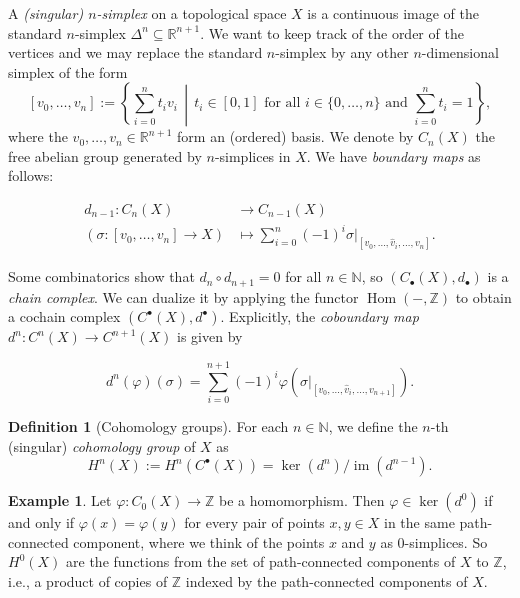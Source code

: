 \documentclass[12pt,a4paper]{amsart}
\theoremstyle{plain}
\theoremstyle{definition}
\newtheorem{defn}[thm]{Definition}
\newtheorem{exmp}[thm]{Example}
\theoremstyle{remark}
\begin{document}
A \emph{(singular) $n$-simplex} on a topological space $X$ is a continuous image of the standard $n$-simplex $\Delta^{n} \subseteq \mathbb{R}^{n+1}$.
We want to keep track of the order of the vertices and we may replace the standard $n$-simplex by any other $n$-dimensional simplex of the form
\[ [v_{0}, \ldots, v_{n}] := \left\{ \sum_{i = 0}^{n} t_{i}v_{i} \,\middle|\, t_{i} \in [0,1] \text{ for all } i \in \{0,\ldots, n\} \text{ and } \sum_{i = 0}^{n} t_{i} = 1 \right\}, \]
where the $v_{0}, \ldots, v_{n} \in \mathbb{R}^{n+1}$ form an (ordered) basis.
We denote by $C_{n}(X)$ the free abelian group generated by $n$-simplices in $X$.
We have \emph{boundary maps} as follows:

\begin{align*}
  d_{n-1} \colon C_{n}(X) & \longrightarrow C_{n-1}(X) \\
  (\sigma \colon [v_{0},\ldots,v_{n}] \to X) & \longmapsto \sum_{i = 0}^{n} (-1)^{i}\sigma|_{[v_{0}, \ldots, \hat{v}_{i}, \ldots, v_{n}]}.
\end{align*}

Some combinatorics \cite[Lemma 2.1]{hat02} show that $d_{n} \circ d_{n+1} = 0$ for all $n \in \mathbb{N}$, so $(C_{\bullet}(X),d_{\bullet})$ is a \emph{chain complex}.
We can dualize it by applying the functor $\operatorname{Hom}(-,\mathbb{Z})$ to obtain a cochain complex $(C^{\bullet}(X),d^{\bullet})$.
Explicitly, the \emph{coboundary map} $d^{n} \colon C^{n}(X) \to C^{n+1}(X)$ is given by

\begin{equation}\label{eqn:coboundary}
  d^{n}(\varphi)(\sigma) = \sum_{i = 0}^{n+1} (-1)^{i}\varphi(\sigma|_{[v_{0}, \ldots, \hat{v}_{i}, \ldots, v_{n+1}]}).
\end{equation}

\begin{defn}[Cohomology groups]
  For each $n \in \mathbb{N}$, we define the $n$-th (singular) \emph{cohomology group} of $X$ as
  \[ H^{n}(X) := H^{n}(C^{\bullet}(X)) = \ker(d^{n})/\operatorname{im}(d^{n-1}). \]
\end{defn}

\begin{exmp}
  Let $\varphi \colon C_{0}(X) \to \mathbb{Z}$ be a homomorphism.
  Then $\varphi \in \ker(d^{0})$ if and only if $\varphi(x) = \varphi(y)$ for every pair of points $x, y \in X$ in the same path-connected component, where we think of the points $x$ and $y$ as $0$-simplices.
  So $H^{0}(X)$ are the functions from the set of path-connected components of $X$ to $\mathbb{Z}$, i.e., a product of copies of $\mathbb{Z}$ indexed by the path-connected components of $X$.
\end{exmp}
\end{document}
